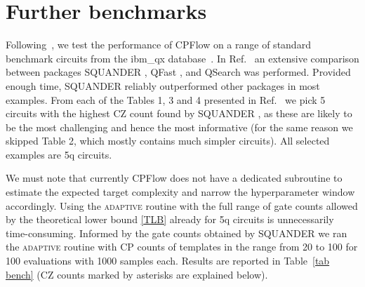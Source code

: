 \documentclass[twocolumn, amsfonts, amssymb, aps, nofootinbib]{revtex4-2}
\newcommand{\CZ}{\textsf{CZ }}
\newcommand{\CP}{\textsf{CP }}
\newcommand{\package}[1]{\textrm {#1 }}
\newcommand{\cpflow}{\package{CPFlow}}
\newcommand{\adaptive}{\textsc{adaptive }}
\begin{document}
\begin{table*}[]
{	}
	\label{tab bench}
\end{table*}

\section{Further benchmarks \label{sec benchmark}}

Following~\cite{Rakyta2022}, we test the performance of \package{CPFlow} on a range of standard benchmark circuits from the ibm\_qx database~\cite{Zulehner2019, ibmqx}. In Ref.~\cite{Rakyta2022} an extensive comparison between packages \package{SQUANDER}, \package{QFast}, and \package{QSearch} was performed. Provided enough time, \package{SQUANDER} reliably outperformed other packages in most examples. From each of the Tables 1, 3 and 4 presented in Ref.~\cite{Rakyta2022} we pick 5 circuits with the highest \CZ count found by \package{SQUANDER}, as these are likely to be the most challenging and hence the most informative (for the same reason we skipped Table 2, which mostly contains much simpler circuits). All selected examples are 5q circuits.

We must note that currently \cpflow does not have a dedicated subroutine to estimate the expected target complexity and narrow the hyperparameter window accordingly. Using the \adaptive routine with the full range of gate counts allowed by the theoretical lower bound \eqref{TLB} already for 5q circuits is unnecessarily time-consuming. Informed by the gate counts obtained by \package{SQUANDER} we ran the \adaptive routine with \CP counts of templates in the range from 20 to 100 for 100 evaluations with 1000 samples each. Results are reported in Table~\ref{tab bench} (\CZ counts marked by asterisks are explained below).
\end{document}
